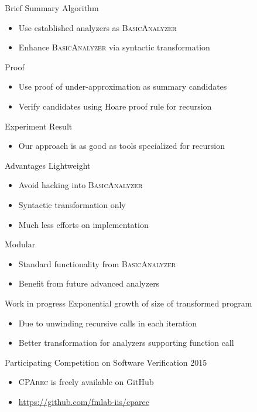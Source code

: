 
\begin{frame}{Brief Summary}
  Algorithm
  \begin{itemize}
    \item Use established analyzers as \textsc{BasicAnalyzer}
    \item Enhance \textsc{BasicAnalyzer} via syntactic transformation
  \end{itemize}
  \vfill
  Proof
  \begin{itemize}
    \item Use proof of under-approximation as summary candidates
    \item Verify candidates using Hoare proof rule for recursion  
  \end{itemize}
  \vfill
  Experiment Result
  \begin{itemize}
    \item Our approach is as good as tools specialized for recursion
  \end{itemize}
\end{frame}

\begin{frame}{Advantages}
  Lightweight
  \begin{itemize}
    \item Avoid hacking into \textsc{BasicAnalyzer}
    \item Syntactic transformation only
    \item Much less efforts on implementation
  \end{itemize}
  \vfill
  Modular
  \begin{itemize}
    \item Standard functionality from \textsc{BasicAnalyzer}
    \item Benefit from future advanced analyzers
  \end{itemize}
\end{frame}

\begin{frame}{Work in progress}
  Exponential growth of size of transformed program
  \begin{itemize}
    \item Due to unwinding recursive calls in each iteration
    \item Better transformation for analyzers supporting function call
  \end{itemize}
  \vfill
  Participating Competition on Software Verification 2015
  \begin{itemize}
    \item \textsc{CPArec} is freely available on GitHub
    \item \href{https://github.com/fmlab-iis/cparec}{https://github.com/fmlab-iis/cparec}
  \end{itemize}
\end{frame}

